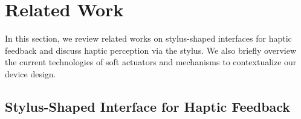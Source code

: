 \section{Related Work}
\label{2}

In this section, we review related works on stylus-shaped interfaces for haptic feedback and discuss haptic perception via the stylus.
We also briefly overview the current technologies of soft actuators and mechanisms to contextualize our device design.

\subsection{Stylus-Shaped Interface for Haptic Feedback}
\label{2_1}

